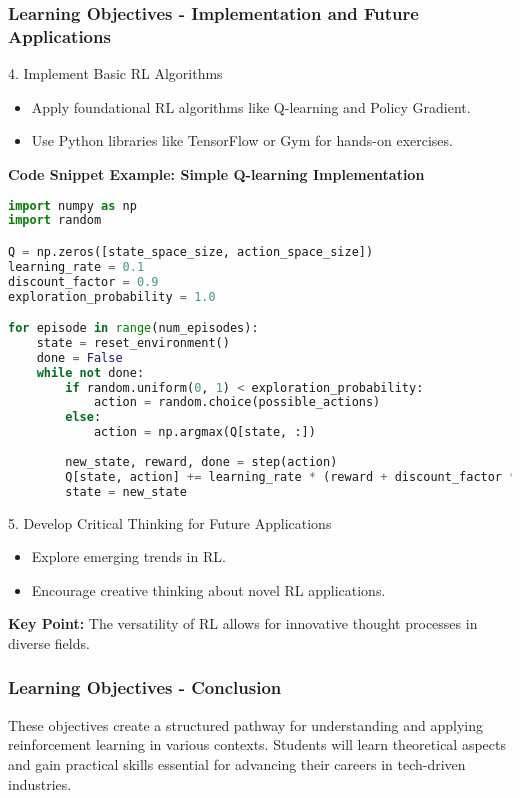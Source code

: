 \documentclass{beamer}
\begin{document}
\begin{frame}[fragile]
    \frametitle{Learning Objectives - Implementation and Future Applications}
    \begin{block}{4. Implement Basic RL Algorithms}
        \begin{itemize}
            \item Apply foundational RL algorithms like Q-learning and Policy Gradient.
            \item Use Python libraries like TensorFlow or Gym for hands-on exercises.
        \end{itemize}
        \textbf{Code Snippet Example: Simple Q-learning Implementation}
        \begin{lstlisting}[language=Python]
import numpy as np
import random

Q = np.zeros([state_space_size, action_space_size])
learning_rate = 0.1
discount_factor = 0.9
exploration_probability = 1.0

for episode in range(num_episodes):
    state = reset_environment()
    done = False
    while not done:
        if random.uniform(0, 1) < exploration_probability:
            action = random.choice(possible_actions)
        else:
            action = np.argmax(Q[state, :])
        
        new_state, reward, done = step(action)
        Q[state, action] += learning_rate * (reward + discount_factor * np.max(Q[new_state, :]) - Q[state, action])
        state = new_state
        \end{lstlisting}
    \end{block}
    
    \begin{block}{5. Develop Critical Thinking for Future Applications}
        \begin{itemize}
            \item Explore emerging trends in RL.
            \item Encourage creative thinking about novel RL applications.
        \end{itemize}
        \textbf{Key Point:} The versatility of RL allows for innovative thought processes in diverse fields.
    \end{block}
\end{frame}

\begin{frame}[fragile]
    \frametitle{Learning Objectives - Conclusion}
    These objectives create a structured pathway for understanding and applying reinforcement learning in various contexts. 
    Students will learn theoretical aspects and gain practical skills essential for advancing their careers in tech-driven industries.
\end{frame}
\end{document}
